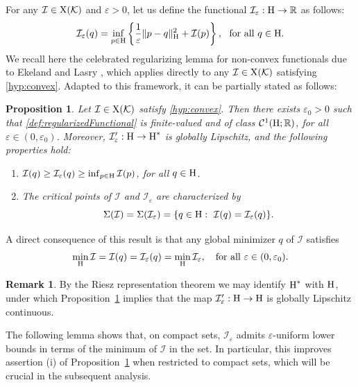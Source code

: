\documentclass{article}
\newcommand{\boC}{\mathcal{C}}
\newcommand{\boK}{\mathcal{K}}
\newcommand{\boI}{\mathcal{I}}
\newcommand{\R}{\mathbb{R}}
\newcommand{\Hilb}{{\textnormal H}}
\newcommand{\X}{{\textnormal X}}
\newtheorem{proposition}{Proposition}[section]
\theoremstyle{definition}
\newtheorem{remark}{Remark}[section]
\begin{document}
For any $\boI\in\X(\boK)$ and $\varepsilon>0$, let us define the functional $\boI_\varepsilon:\Hilb\to\R$ as follows:
\begin{equation}\label{def:regularizedFunctional}
	\boI_\varepsilon(q)=\inf_{p\in\Hilb}\left\{\frac1\varepsilon\|p-q\|^2_{\Hilb} + \boI(p)\right\},\ \hbox{ for all }q\in\Hilb.
\end{equation}
We recall here the celebrated regularizing lemma for non-convex functionals due to Ekeland and Lasry \cite[Lemma 7]{Eke-Las}, which applies directly to any $\boI\in\X(\boK)$ satisfying \eqref{hyp:convex}. Adapted to this framework, it can be partially stated as follows:
\begin{proposition}\label{pro:regularizing} Let $\boI\in\X(\boK)$ satisfy \eqref{hyp:convex}. Then there exists $\varepsilon_0>0$ such that \eqref{def:regularizedFunctional} is finite-valued and of class $\boC^1(\Hilb;\R)$,  for all $\varepsilon\in(0,\varepsilon_0)$. Moreover, $\boI'_\varepsilon:\Hilb\to\Hilb^*$ is globally Lipschitz, and the following properties hold:
	\begin{enumerate}
		\item[(i)]$ \boI(q)\geq \boI_\varepsilon(q) \geq \inf_{p\in\Hilb} \boI(p)$, for all $q\in\Hilb$. 
		\item[(ii)] The critical points of $\boI$ and $\boI_\varepsilon$ are characterized by
		\begin{equation}\label{def:CriticalPoint-Iepsilon}
			\Sigma(\boI)=\Sigma(\boI_\varepsilon)=\{q\in\Hilb:\ \boI(q)=\boI_\varepsilon(q)\}.
		\end{equation}
	\end{enumerate}
\end{proposition}

A direct consequence of this result is that any global minimizer $q$ of $\boI$  satisfies
\begin{equation*}
	\min_{\Hilb}\boI=\boI(q)=\boI_\varepsilon(q)=\min_{\Hilb}\boI_\varepsilon,\quad\hbox{for all $\varepsilon\in(0,\varepsilon_0)$}.
\end{equation*}


\begin{remark}\label{remark:Lipschitz}
By the Riesz representation theorem we may identify $\Hilb^*$ with $\Hilb$, under which Proposition~\ref{pro:regularizing} implies that the map $\boI'_\varepsilon:\Hilb\to\Hilb$ is globally Lipschitz continuous.
\end{remark}

The following lemma shows that, on compact sets, $\mathcal{I}_\varepsilon$ admits $\varepsilon$-uniform lower bounds in terms of the minimum of $\mathcal{I}$ in the set. In particular, this improves assertion (i) of Proposition~\ref{pro:regularizing} when restricted to compact sets, which will be crucial in the subsequent analysis.
\end{document}
